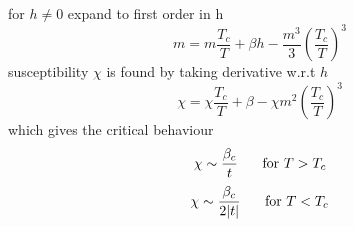 \documentclass[table,cmyk]{article}
\begin{document}
\begin{longtable}
for $h\ne 0$ expand to first order in h
\[m=m\frac{T_c}{T} + \beta h - \frac{m^3}{3}\left(\frac{T_c}{T}\right)^3\]
susceptibility $\chi$ is found by taking derivative w.r.t $h$
\[\chi = \chi\frac{T_c}{T} + \beta - \chi m^2\left(\frac{T_c}{T}\right)^3\]
which gives the critical behaviour
\[\chi \sim \frac{\beta_c}{t} \text{\hspace{0.5cm} for } T>T_c\]
\[\chi \sim \frac{\beta_c}{2|t|} \text{\hspace{0.5cm} for } T<T_c\]

\tabularnewline\hline

\end{longtable}
\end{document}
